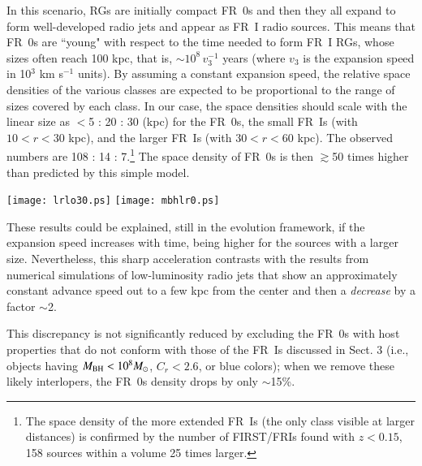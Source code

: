 \documentclass[traditabstract]{aa}
\newcommand{\FR}{FRI{\sl{CAT}}}\newcommand{\FRII}{FRII{\sl{CAT}}}
\newcommand{\FRo}{FR0{\sl{CAT}}}
\newcommand{\sFR}{sFRI{\sl{CAT}}}
\begin{document}
In this scenario, RGs are initially compact FR~0s and then they all
expand to form well-developed radio jets and appear as FR~I radio
sources.  This means that FR~0s are ``young" with respect to the time
needed to form FR~I RGs, whose sizes often reach 100 kpc, that is,
$\sim 10^8 \,v_{3}^{-1}$ years (where $v_{3}$ is the expansion speed
in 10$^3$ km s$^{-1}$ units). By assuming a constant expansion speed,
the relative space densities of the various classes are expected to be
proportional to the range of sizes covered by each class. In our case,
the space densities should scale with the linear size as $<$5 : 20 :
30 (kpc) for the FR~0s, the small FR~Is (with $10 < r < 30$ kpc), and
the larger FR~Is (with $30 < r < 60$ kpc). The observed numbers are
108 : 14 : 7.\footnote{The space density of the more extended FR~Is
  (the only class visible at larger distances) is confirmed by the
  number of FIRST/FRIs found with $z<0.15$, 158 sources within a
  volume 25 times larger.} The space density of FR~0s is then
$\gtrsim$50 times higher than predicted by this simple model.


\begin{figure*}
\texttt{[image: lrlo30.ps]}
\texttt{[image: mbhlr0.ps]}
\caption{Left panel: radio (NVSS) versus [O~III] line luminosity of the
  \FRo\ (blue), \FR\ (black), and \sFR\ (red) sources. The \FR\ sources with
  $z<0.05$ are represented as black dots with a red asterisk
superposed. The
  green line shows the correlation between these two quantities derived from
  the FR~Is of the 3C sample from \citep{buttiglione10}, individually marked
  with the green crosses. Right panel: radio luminosity versus BH
  mass (M$_{\odot}$).}
\label{mrur}
\end{figure*}

These results could be explained, still in the evolution framework, if
the expansion speed increases with time, being higher for the sources
with a larger size. Nevertheless, this sharp acceleration contrasts
with the results from numerical simulations of low-luminosity radio
jets \citep{massaglia16} that show an approximately constant advance
speed out to a few kpc from the center and then a {\sl decrease} by a
factor $\sim$2.

This discrepancy is not significantly reduced by excluding the FR~0s
with host properties that do not conform with those of the FR~Is
discussed in Sect. 3 (i.e., objects having
$M_{\rm BH} < 10^8 M_\odot$, $C_r < 2.6$, or blue colors); when we
remove these likely interlopers, the FR~0s density drops by only
$\sim$15\%.
\end{document}
